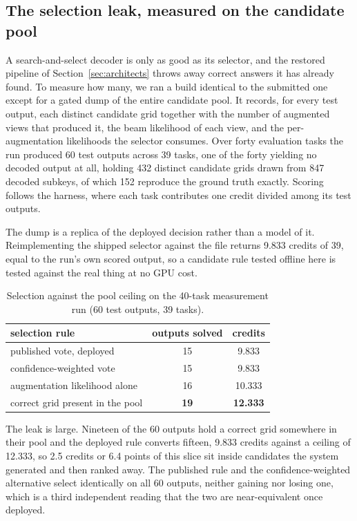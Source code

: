 \documentclass[11pt]{article}
\begin{document}
\subsection{The selection leak, measured on the candidate pool}
\label{sec:selection}
A search-and-select decoder is only as good as its selector, and the restored pipeline of
Section~\ref{sec:architects} throws away correct answers it has already found. To measure how many, we ran a
build identical to the submitted one except for a gated dump of the entire candidate pool. It records, for
every test output, each distinct candidate grid together with the number of augmented views that produced
it, the beam likelihood of each view, and the per-augmentation likelihoods the selector consumes. Over forty
evaluation tasks the run produced 60 test outputs across 39 tasks, one of the forty yielding no decoded
output at all, holding 432 distinct candidate grids drawn from 847 decoded subkeys, of which 152 reproduce
the ground truth exactly. Scoring follows the harness, where each task contributes one credit divided among
its test outputs.

The dump is a replica of the deployed decision rather than a model of it. Reimplementing the shipped
selector against the file returns 9.833 credits of 39, equal to the run's own scored output, so a candidate
rule tested offline here is tested against the real thing at no GPU cost.

\begin{table}[H]
\centering
\caption{Selection against the pool ceiling on the 40-task measurement run (60 test outputs, 39 tasks).}
\label{tab:selection}
\begin{tabular}{lcc}
\toprule
selection rule & outputs solved & credits \\
\midrule
published vote, deployed              & 15 & 9.833 \\
confidence-weighted vote              & 15 & 9.833 \\
augmentation likelihood alone         & 16 & 10.333 \\
\midrule
correct grid present in the pool      & \textbf{19} & \textbf{12.333} \\
\bottomrule
\end{tabular}
\end{table}

The leak is large. Nineteen of the 60 outputs hold a correct grid somewhere in their pool and the deployed
rule converts fifteen, 9.833 credits against a ceiling of 12.333, so 2.5 credits or 6.4 points of this slice
sit inside candidates the system generated and then ranked away. The published rule and the
confidence-weighted alternative select identically on all 60 outputs, neither gaining nor losing one, which
is a third independent reading that the two are near-equivalent once deployed.
\end{document}
